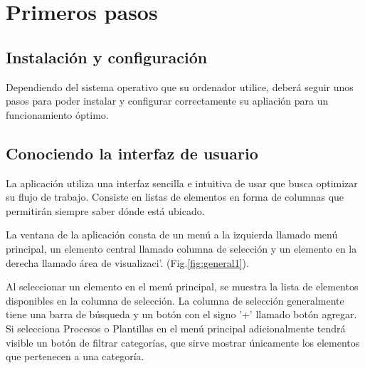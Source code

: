\chapter{Primeros pasos}
\setcounter{page}{4}

\section{Instalaci\'on y configuraci\'on}
Dependiendo del sistema operativo que su ordenador utilice, deber\'a seguir unos pasos para poder instalar y
configurar correctamente su apliaci\'on para un funcionamiento \'optimo. 
\subsection{\windows}
\subsection{\mac}
\subsection{\linux}

\section{Conociendo la interfaz de usuario}
La aplicaci\'on utiliza una interfaz sencilla e intuitiva de usar que busca optimizar su flujo de trabajo. Consiste en listas de elementos en forma de columnas que permitir\'an siempre saber d\'onde est\'a ubicado.

La ventana de la aplicaci\'on consta de un men\'u a la izquierda llamado men\'u principal, un elemento central llamado columna de selecci\'on y un elemento en la derecha llamado \'area de visualizaci'\on. (Fig.\ref{fig:general1}). 


Al seleccionar un elemento en el men\'u principal, se muestra la lista de elementos disponibles en la columna de selecci\'on. La columna de selecci\'on generalmente tiene una barra de b\'usqueda y un bot\'on con el signo '+' llamado bot\'on agregar. Si selecciona Procesos o Plantillas en el men\'u principal adicionalmente tendr\'a visible un bot\'on de filtrar categor\'ias, que sirve mostrar \'unicamente los elementos que pertenecen a una categor\'ia.

